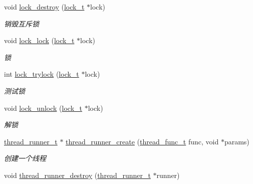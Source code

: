 \begin{DoxyCompactItemize}
void \hyperlink{a00081_aba61c8c4b8ee5ec7e337ed950d680702_aba61c8c4b8ee5ec7e337ed950d680702}{lock\+\_\+destroy} (\hyperlink{a00050_ad3e00e0eb0c79dfd77ff2ff833f49c7d_ad3e00e0eb0c79dfd77ff2ff833f49c7d}{lock\+\_\+t} $\ast$lock)
\begin{DoxyCompactList}\small\item\em 销毁互斥锁 \end{DoxyCompactList}\item 
void \hyperlink{a00081_ad8e04f3d702d3f15868c064947d396b3_ad8e04f3d702d3f15868c064947d396b3}{lock\+\_\+lock} (\hyperlink{a00050_ad3e00e0eb0c79dfd77ff2ff833f49c7d_ad3e00e0eb0c79dfd77ff2ff833f49c7d}{lock\+\_\+t} $\ast$lock)
\begin{DoxyCompactList}\small\item\em 锁 \end{DoxyCompactList}\item 
int \hyperlink{a00081_a2caa15f5d1698c623c1861bd02184d0e_a2caa15f5d1698c623c1861bd02184d0e}{lock\+\_\+trylock} (\hyperlink{a00050_ad3e00e0eb0c79dfd77ff2ff833f49c7d_ad3e00e0eb0c79dfd77ff2ff833f49c7d}{lock\+\_\+t} $\ast$lock)
\begin{DoxyCompactList}\small\item\em 测试锁 \end{DoxyCompactList}\item 
void \hyperlink{a00081_a99cf1d42527f5715b798064281e918ed_a99cf1d42527f5715b798064281e918ed}{lock\+\_\+unlock} (\hyperlink{a00050_ad3e00e0eb0c79dfd77ff2ff833f49c7d_ad3e00e0eb0c79dfd77ff2ff833f49c7d}{lock\+\_\+t} $\ast$lock)
\begin{DoxyCompactList}\small\item\em 解锁 \end{DoxyCompactList}\item 
\hyperlink{a00050_a9054159cde2f926ef61c28ce1e555199_a9054159cde2f926ef61c28ce1e555199}{thread\+\_\+runner\+\_\+t} $\ast$ \hyperlink{a00107_gac20d7726e152e0b49209ce228893c25d_gac20d7726e152e0b49209ce228893c25d}{thread\+\_\+runner\+\_\+create} (\hyperlink{a00050_a46bcd8005e5d86fdbc6be5af0a77156c_a46bcd8005e5d86fdbc6be5af0a77156c}{thread\+\_\+func\+\_\+t} func, void $\ast$params)
\begin{DoxyCompactList}\small\item\em 创建一个线程 \end{DoxyCompactList}\item 
void \hyperlink{a00107_ga8b9d3d45b6055971fc40f24ec6572cf6_ga8b9d3d45b6055971fc40f24ec6572cf6}{thread\+\_\+runner\+\_\+destroy} (\hyperlink{a00050_a9054159cde2f926ef61c28ce1e555199_a9054159cde2f926ef61c28ce1e555199}{thread\+\_\+runner\+\_\+t} $\ast$runner)

\end{DoxyCompactItemize}
